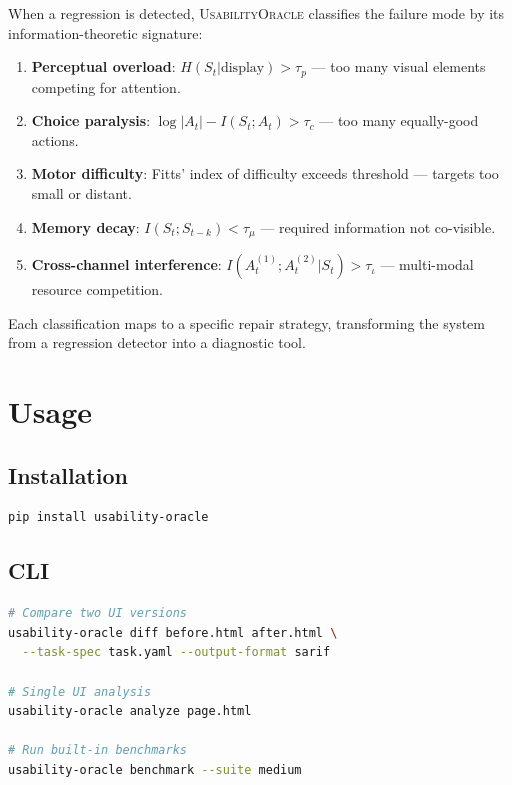 \documentclass[11pt,twocolumn]{article}
\theoremstyle{definition}
\newcommand{\tool}{\textsc{UsabilityOracle}}
\begin{document}
When a regression is detected, \tool{} classifies the failure mode by its information-theoretic signature:

\begin{enumerate}[nosep]
  \item \textbf{Perceptual overload}: $H(S_t | \text{display}) > \tau_p$ --- too many visual elements competing for attention.
  \item \textbf{Choice paralysis}: $\log|A_t| - I(S_t; A_t) > \tau_c$ --- too many equally-good actions.
  \item \textbf{Motor difficulty}: Fitts' index of difficulty exceeds threshold --- targets too small or distant.
  \item \textbf{Memory decay}: $I(S_t; S_{t-k}) < \tau_\mu$ --- required information not co-visible.
  \item \textbf{Cross-channel interference}: $I(A^{(1)}_t; A^{(2)}_t | S_t) > \tau_\iota$ --- multi-modal resource competition.
\end{enumerate}

Each classification maps to a specific repair strategy, transforming the system from a regression detector into a diagnostic tool.

\section{Usage}
\label{sec:usage}

\subsection{Installation}

\begin{lstlisting}[language=bash,numbers=none]
pip install usability-oracle
\end{lstlisting}

\subsection{CLI}

\begin{lstlisting}[language=bash,numbers=none]
# Compare two UI versions
usability-oracle diff before.html after.html \
  --task-spec task.yaml --output-format sarif

# Single UI analysis
usability-oracle analyze page.html

# Run built-in benchmarks
usability-oracle benchmark --suite medium
\end{lstlisting}
\end{document}
